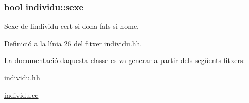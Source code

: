 \subsubsection[{\texorpdfstring{sexe}{sexe}}]{\setlength{\rightskip}{0pt plus 5cm}bool individu\+::sexe\hspace{0.3cm}{\ttfamily [private]}}\hypertarget{classindividu_ab62faa6985cc0520c33a206fc5a89e37}{}\label{classindividu_ab62faa6985cc0520c33a206fc5a89e37}


Sexe de l\textquotesingle{}individu cert si dona fals si home. 



Definició a la línia 26 del fitxer individu.\+hh.



La documentació d\textquotesingle{}aquesta classe es va generar a partir dels següents fitxers\+:\begin{DoxyCompactItemize}
\item 
\hyperlink{individu_8hh}{individu.\+hh}\item 
\hyperlink{individu_8cc}{individu.\+cc}\end{DoxyCompactItemize}
